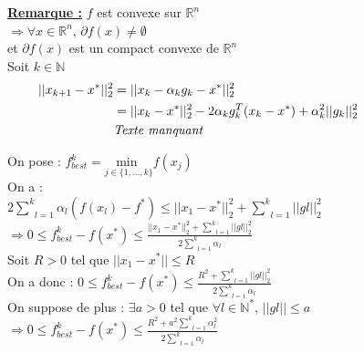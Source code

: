 \documentclass[12pt,a4paper]{article}
\begin{document}
\noindent\underline{\textbf{Remarque :}}
$f$ est convexe sur $\mathbb{R}^n$\\
$\Rightarrow \forall x \in \mathbb{R}^n$, $\partial f(x) \neq \emptyset$\\
et $\partial f(x)$ est un compact convexe de $\mathbb{R}^n$\\

\noindent Soit $k \in \mathbb{N}$
\begin{align*}
    ||x_{k+1} - x^*||_2^2 &= ||x_k - \alpha_k g_k - x^*||_2^2 \hspace{14.5cm}\\
    &= ||x_k - x^*||_2^2 - 2 \alpha_k g_k^T (x_k - x^*) + \alpha_k^2 ||g_k||_2^2\\
    &\textit{Texte manquant}\\
\end{align*}


On pose : $f^k_{best} = \underset{j \in \{1, \dots, k\}}{\text{min }} f(x_j)$\\
On a :\\
$2 \underset{l = 1}{\overset{k}{\sum}} \alpha_l (f(x_l) - f^*) \leq ||x_1 - x^*||_2^2 + \underset{l = 1}{\overset{k}{\sum}} ||gl||_2^2$\\
$\Rightarrow 0 \leq f^k_{best} - f(x^*) \leq \frac{||x_1 - x^*||_2^2 + \underset{l = 1}{\overset{k}{\sum}} ||gl||_2^2}{2 \underset{l = 1}{\overset{k}{\sum}} \alpha_l}$\\

Soit $R > 0$ tel que $||x_1 - x^*|| \leq R$\\

On a donc : $0 \leq f^k_{best} - f(x^*) \leq \frac{R^2 + \underset{l = 1}{\overset{k}{\sum}} ||gl||_2^2}{2 \underset{l = 1}{\overset{k}{\sum}} \alpha_l}$\\


On suppose de plus : $\exists a > 0$ tel que $\forall l \in \mathbb{N}^*$, $||gl|| \leq a$\\
$\Rightarrow 0 \leq f^k_{best} - f(x^*) \leq \frac{R^2 + a^2 \underset{l = 1}{\overset{k}{\sum}} \alpha_l^2}{2 \underset{l = 1}{\overset{k}{\sum}} \alpha_l}$\\
\end{document}
